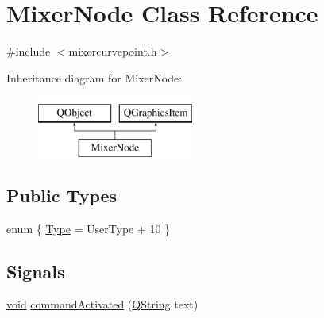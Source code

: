 \hypertarget{class_mixer_node}{\section{Mixer\-Node Class Reference}
\label{class_mixer_node}
}


{\ttfamily \#include $<$mixercurvepoint.\-h$>$}

Inheritance diagram for Mixer\-Node\-:\begin{figure}[H]
\begin{center}
\leavevmode
\includegraphics[height=2.000000cm]{class_mixer_node}
\end{center}
\end{figure}
\subsection*{Public Types}
\begin{DoxyCompactItemize}
\item 
enum \{ \hyperlink{group___u_a_v_object_widget_utils_gga75c1a0485015845b058fbc969b688e5aae34bb4f715b22e70e0a2182529bed883}{Type} = User\-Type + 10
 \}
\end{DoxyCompactItemize}
\subsection*{Signals}
\begin{DoxyCompactItemize}
\item 
\hyperlink{group___u_a_v_objects_plugin_ga444cf2ff3f0ecbe028adce838d373f5c}{void} \hyperlink{group___u_a_v_object_widget_utils_ga942a3a9bcc32e276d18b155ef73298f1}{command\-Activated} (\hyperlink{group___u_a_v_objects_plugin_gab9d252f49c333c94a72f97ce3105a32d}{Q\-String} text)
\end{DoxyCompactItemize}
